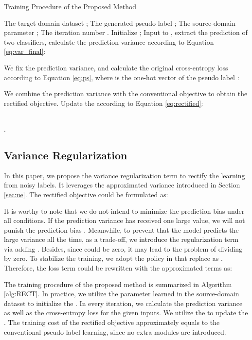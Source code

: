 \begin{algorithm}[t]
\small
\caption{Training Procedure of the Proposed Method}
\label{alg:RECT}
\begin{algorithmic}[1]
\Require The target domain dataset ; The generated pseudo label ; 
\Require The source-domain parameter ; The iteration number .
\State Initialize ;
\State Input  to , extract the prediction of two classifiers, calculate the prediction variance according to Equation \ref{eq:var_final}:
\vspace{-1.5ex}

\vspace{-2ex}
\State We fix the prediction variance, and calculate the original cross-entropy loss according to Equation \ref{eq:ps}, where   is the one-hot vector of the pseudo label : 
\vspace{-1.5ex}

\State We combine the prediction variance with the conventional objective to obtain the rectified objective. Update the  according to Equation \ref{eq:rectified}:
\vspace{-1.5ex}

\vspace{-4ex}
\EndFor \\
\Return .
\end{algorithmic}
\end{algorithm}

\subsection{Variance Regularization}\label{sec:vr}
In this paper, we propose the variance regularization term to rectify the learning from noisy labels. It leverages the approximated variance introduced in Section \ref{sec:ue}. 
The rectified objective could be formulated as:
 
It is worthy to note that we do not intend to minimize the prediction bias under all conditions. If the prediction variance has received one large value, we will not punish the prediction bias . Meanwhile, to prevent that the model predicts the large variance all the time, as a trade-off, we introduce the regularization term via adding . 
Besides, since  could be zero, it may lead to the problem of dividing by zero. To stabilize the training, we adopt the policy in \cite{kendall2017uncertainties} that replace  as . Therefore, the loss term could be rewritten with the approximated terms as:
 
The training procedure of the proposed method is summarized in Algorithm \ref{alg:RECT}. In practice, we utilize the parameter  learned in the source-domain dataset to initialize the . In every iteration, we calculate the prediction variance as well as the cross-entropy loss for the given inputs. We utilize the  to update the . The training cost of the rectified objective approximately equals to the conventional pseudo label learning, since no extra modules are introduced.

